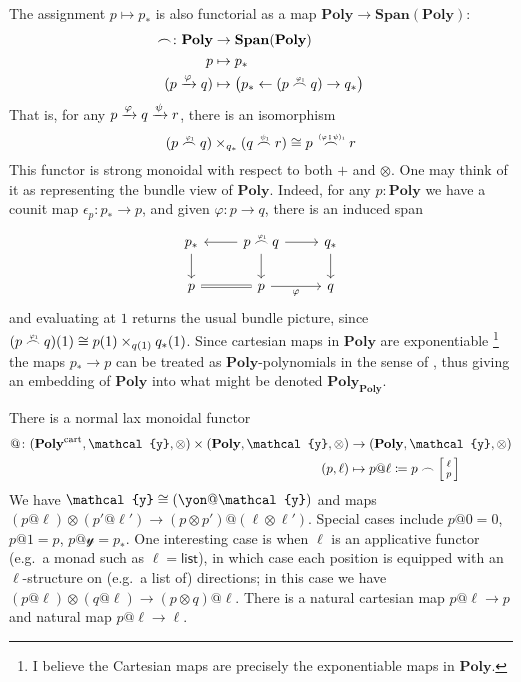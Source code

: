 \documentclass[11pt, one side, article]{memoir}
\makeatletter
\theoremstyle{definition}
\theoremstyle{plain}
\newcommand{\Cat}[1]{\mathbf{#1}}%
\newcommand{\Fun}[1]{\mathsf{#1}}%
\newcommand{\then}{\mathbin{\fatsemi}}
\newcommand{\To}[2][]{\xrightarrow[#1]{\tn{$#2$}}}
\newcommand{\from}{\leftarrow}
\newcommand{\tn}[1]{\textnormal{#1}}
\newcommand{\List}{\Fun{list}}
\newcommand{\yon}{{\mathcal{y}}}
\newcommand{\poly}{\Cat{Poly}}
\newcommand{\Span}{\Cat{Span}}
\newcommand{\polycart}{\poly^{\tn{cart}}}
\newcommand{\0}{\textsf{0}}
\newcommand{\1}{\tn{\textsf{1}}}
\newcommand{\biglens}[2]{
     \begin{bmatrix}{\vphantom{f_f^f}#2} \\ {\vphantom{f_f^f}#1} \end{bmatrix}
}
\newcommand{\littlelens}[2]{
     \begin{bsmallmatrix}{\vphantom{f}#2} \\ {\vphantom{f}#1} \end{bsmallmatrix}
}
\newcommand{\lens}[2]{
  \relax\if@display
     \biglens{#1}{#2}
  \else
     \littlelens{#1}{#2}
  \fi
}
\newcommand{\indexcoclscale}[1]{\scalebox{.7}{#1}}
\newcommand{\cocl}[1]{
	\scriptsize\overset{\,\indexcoclscale{$#1$}}{\frown}\normalsize
}
\makeatother
\begin{document}
The assignment $p\mapsto p_*$ is also functorial as a map $\poly\to\Span(\poly)$:
\begin{align}
	\cocl{}\colon\poly&\to\Span(\poly)\\
	p&\mapsto p_*\\
	(p\To{\varphi}q)&\mapsto\big( p_*\from(p\cocl{\varphi_1}q)\to q_*\big)
\end{align}\goodbreak
That is, for any $p\To{\varphi}q\To{\psi}r$, there is an isomorphism
\begin{equation}
	(p\cocl{\varphi_1}q)\times_{ q_*}(q\cocl{\psi_1}r)\cong p\cocl{(\varphi\then\psi)_1}r
\end{equation}
This functor is strong monoidal with respect to both $+$ and $\otimes$. One may think of it as representing the bundle view of $\poly$. Indeed, for any $p:\poly$ we have a counit map $\epsilon_p\colon p_*\to p$, and given $\varphi\colon p\to q$, there is an induced span
\begin{equation}
\begin{tikzcd}
	 p_*\ar[d]&p\cocl{\varphi_1}q\ar[d]\ar[l]\ar[r]& q_*\ar[d]\\
	p\ar[r, equal]&p\ar[r,"\varphi"']&q
\end{tikzcd}
\end{equation}
and evaluating at $1$ returns the usual bundle picture, since $(p\cocl{\varphi_1}q)(1)\cong p(1)\times_{q(1)}q_*(1)$. Since cartesian maps in $\poly$ are exponentiable%
\footnote{I believe the Cartesian maps are precisely the exponentiable maps in $\poly$.}
the maps $p_*\to p$ can be treated as $\poly$-polynomials in the sense of \cite{weber2015polynomials}, thus giving an embedding of $\poly$ into what might be denoted $\poly_\poly$.

There is a normal lax monoidal functor 
\begin{align}
	@\colon(\polycart,\yon,\otimes)\times(\poly,\yon,\otimes)&\to(\poly,\yon,\otimes)\\
	(p,\ell)&\mapsto p@\ell\coloneqq p\frown\lens{p}{\ell}
\end{align}
We have $\yon\cong(\yon@\yon)$ and maps $(p@\ell)\otimes(p'@\ell')\to(p\otimes p')@(\ell\otimes\ell')$. Special cases include $p@0=0$, $p@1=p$, $p@\yon=p_*$. One interesting case is when $\ell$ is an applicative functor (e.g.\ a monad such as $\ell=\List$), in which case each position is equipped with an $\ell$-structure on (e.g.\ a list of) directions; in this case we have $(p@\ell)\otimes(q@\ell)\to (p\otimes q)@\ell$. There is a natural cartesian map $p@\ell\to p$ and natural map $p@\ell\to\ell$.
\end{document}
